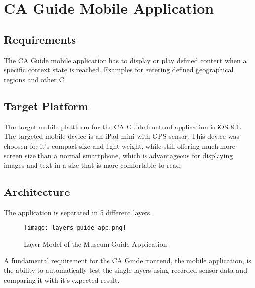 
\chapter{CA Guide Mobile Application} %

\label{frontend} %



\section{Requirements}

The CA Guide mobile application has to display or play defined content when a specific context state is reached. Examples for entering defined geographical regions and other C. 

\section{Target Platform}

The target mobile plattform for the CA Guide frontend application is iOS 8.1. The targeted mobile device is an iPad mini with GPS sensor. This device was choosen for it's compact size and light weight, while still offering much more screen size than a normal smartphone, which is advantageous for displaying images and text in a size that is more comfortable to read.

\section{Architecture}

The application is separated in 5 different layers.

\begin{figure}[H]
\centering
\texttt{[image: layers-guide-app.png]}
\caption{Layer Model of the Museum Guide Application}
\end{figure}

A fundamental requirement for the CA Guide frontend, the mobile application, is the ability to automatically test the single layers using recorded sensor data and comparing it with it's expected result.

